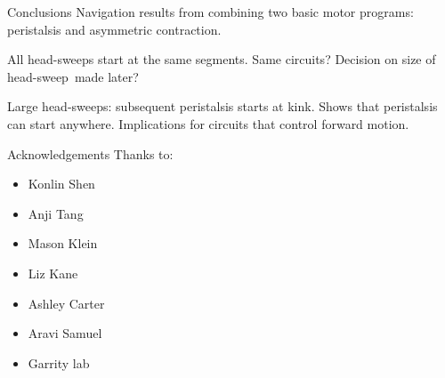 \documentclass{beamer}%
\newcommand{\hs}{head-sweep}
\begin{document}
%
%
%
%
%
%

\begin{frame}{Conclusions}
%
 Navigation results from combining two basic motor programs: peristalsis and asymmetric contraction.

 \vp All \hs s start at the same segments. Same circuits? Decision on size of \hs\ made later?

 \vp Large \hs s: subsequent peristalsis starts at kink. Shows that peristalsis can start anywhere. Implications for circuits that control forward motion.
%
\end{frame}



%
%
%

\begin{frame}{Acknowledgements}
%
 Thanks to:
 \begin{itemize}
   \item Konlin Shen
   \item Anji Tang
   \item Mason Klein
   \item Liz Kane
   \item Ashley Carter
   \item Aravi Samuel
   \item Garrity lab
 \end{itemize}
%
\end{frame}

\end{document}
